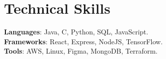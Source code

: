 \documentclass[letterpaper,11pt]{article}
\begin{document}
\section{Technical Skills}
 \begin{itemize}[leftmargin=0.15in, label={}]
    \small{\item{
     \textbf{Languages}{: Java, C, Python, SQL, JavaScript.} \\
     \textbf{Frameworks}{: React, Express, NodeJS, TensorFlow.} \\
     \textbf{Tools}{: AWS, Linux, Figma, MongoDB, Terraform.}
    }}
 \end{itemize}


\end{document}
